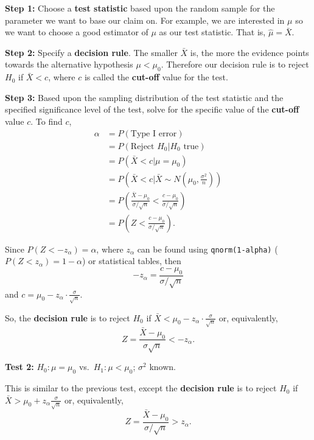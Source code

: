 \documentclass[
]{book}
\begin{document}
\textbf{Step 1:} Choose a {\textbf{test statistic}} based upon the random sample for the parameter we want to base our claim on. For example, we are interested in \(\mu\) so we want to choose a good estimator of \(\mu\) as our test statistic. That is, \(\hat{\mu} = \bar{X}\).

\textbf{Step 2:} Specify a {\textbf{decision rule}}. The smaller \(\bar{X}\) is, the more the evidence points towards the alternative hypothesis \(\mu < \mu_0\). Therefore our decision rule is to reject \(H_0\) if \(\bar{X} < c\), where \(c\) is called the {\textbf{cut-off}} value for the test.

\textbf{Step 3:} Based upon the sampling distribution of the test statistic and the specified significance level of the test, solve for the specific value of the {\textbf{cut-off}} value \(c\). To find \(c\),\\

\begin{align*}
\alpha &= P(\text{Type I error}) \\
&= P(\text{Reject } H_0 | H_0 \text{ true}) \\
&= P(\bar{X} < c | \mu = \mu_0) \\
&= P\left(\bar{X} < c | \bar{X} \sim N\left(\mu_0, \frac{\sigma^2}{n}\right)\right) \\
&= P\left( \frac{\bar{X} - \mu_0}{\sigma/\sqrt{n}} < \frac{c-\mu_0}{\sigma/\sqrt{n}} \right) \\
&= P\left( Z < \frac{c-\mu_0} {\sigma/\sqrt{n}} \right).
\end{align*}

Since \(P(Z < -z_\alpha )=\alpha\), where \(z_\alpha\) can be found using \texttt{qnorm(1-alpha)} (\(P(Z < z_\alpha) =1 - \alpha\)) or statistical tables, then
\[ -z_\alpha = \frac{c-\mu_0}{\sigma/\sqrt{n}} \]
and \(c = \mu_0 -z_\alpha \cdot \frac{\sigma}{\sqrt{n}}\).

So, the \textbf{decision rule} is to reject \(H_0\) if \(\bar{X} < \mu_0 -z_\alpha \cdot \frac{\sigma}{\sqrt{n}}\) or, equivalently,
\[Z = \frac{\bar{X} - \mu_0}{\sigma\sqrt{n}} < -z_\alpha.\]

\leavevmode{}%
{\textbf{Test 2:}} \(H_0: \mu = \mu_0\) vs.~\(H_1: \mu < \mu_0\); \(\sigma^2\) known.

This is similar to the previous test, except the {\textbf{decision rule}} is to reject \(H_0\) if \(\bar{X} > \mu_0 + z_\alpha \frac{\sigma}{\sqrt{n}}\) or, equivalently,
\[Z = \frac{\bar{X} - \mu_0}{\sigma/\sqrt{n}} > z_\alpha.\]
\end{document}
